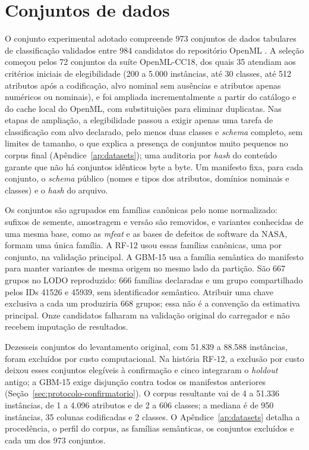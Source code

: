 \section{Conjuntos de dados}
\label{sec:datasets}

O conjunto experimental adotado compreende 973 conjuntos de dados tabulares de classificação validados entre 984 candidatos do repositório OpenML \cite{ref07,ref28}. A seleção começou pelos 72 conjuntos da suíte OpenML-CC18, dos quais 35 atendiam aos critérios iniciais de elegibilidade (200 a 5.000 instâncias, até 30 classes, até 512 atributos após a codificação, alvo nominal sem ausências e atributos apenas numéricos ou nominais), e foi ampliada incrementalmente a partir do catálogo e do cache local do OpenML, com substituições para eliminar duplicatas. Nas etapas de ampliação, a elegibilidade passou a exigir apenas uma tarefa de classificação com alvo declarado, pelo menos duas classes e \textit{schema} completo, sem limites de tamanho, o que explica a presença de conjuntos muito pequenos no corpus final (Apêndice~\ref{ap:datasets}); uma auditoria por \textit{hash} do conteúdo garante que não há conjuntos idênticos byte a byte. Um manifesto fixa, para cada conjunto, o \textit{schema} público (nomes e tipos dos atributos, domínios nominais e classes) e o \textit{hash} do arquivo.

Os conjuntos são agrupados em famílias canônicas pelo nome normalizado: sufixos de semente, amostragem e versão são removidos, e variantes conhecidas de uma mesma base, como as \textit{mfeat} e as bases de defeitos de software da NASA, formam uma única família. A RF-12 usou essas famílias canônicas, uma por conjunto, na validação principal. A GBM-15 usa a família semântica do manifesto para manter variantes de mesma origem no mesmo lado da partição. São 667 grupos no LODO reproduzido: 666 famílias declaradas e um grupo compartilhado pelos IDs 41526 e 45939, sem identificador semântico. Atribuir uma chave exclusiva a cada um produziria 668 grupos; essa não é a convenção da estimativa principal. Onze candidatos falharam na validação original do carregador e não recebem imputação de resultados.

Dezesseis conjuntos do levantamento original, com 51.839 a 88.588 instâncias, foram excluídos por custo computacional. Na história RF-12, a exclusão por custo deixou esses conjuntos elegíveis à confirmação e cinco integraram o \textit{holdout} antigo; a GBM-15 exige disjunção contra todos os manifestos anteriores (Seção~\ref{sec:protocolo-confirmatorio}). O corpus resultante vai de 4 a 51.336 instâncias, de 1 a 4.096 atributos e de 2 a 606 classes; a mediana é de 950 instâncias, 35 colunas codificadas e 2 classes. O Apêndice~\ref{ap:datasets} detalha a procedência, o perfil do corpus, as famílias semânticas, os conjuntos excluídos e cada um dos 973 conjuntos.

